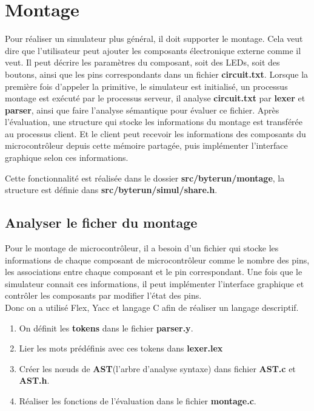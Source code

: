 \documentclass[14px]{article}
\begin{document}
	\clearpage
	\pagestyle{fancy}
	\rhead{\thepage}
	\fancyfoot{}

	\section{Montage}
	Pour réaliser un simulateur plus général, il doit supporter le montage. Cela veut dire que l'utilisateur peut ajouter les composants électronique externe comme il veut. Il peut décrire les paramètres du composant, soit des LEDs, soit des boutons, ainsi que les pins correspondants dans un fichier \textbf{circuit.txt}. Lorsque la première fois d'appeler la primitive, le simulateur est initialisé, un processus montage est exécuté par le processus serveur, il analyse \textbf{circuit.txt} par \textbf{lexer} et \textbf{parser}, ainsi que faire l'analyse sémantique pour évaluer ce fichier. Après l'évaluation, une structure qui stocke les informations du montage est transférée au processus client. Et le client peut recevoir les informations des composants du microcontrôleur depuis cette mémoire partagée, puis implémenter l'interface graphique selon ces informations.

	Cette fonctionnalité est réalisée dans le dossier \textbf{src/byterun/montage}, la structure est définie dans \textbf{src/byterun/simul/share.h}.

	\subsection{Analyser le ficher du montage}
	Pour le montage de microcontrôleur, il a besoin d'un fichier qui stocke les informations de chaque composant de microcontrôleur comme le nombre des pins, les associations entre chaque composant et le pin correspondant. Une fois que le simulateur connait ces informations, il peut implémenter l'interface graphique et contrôler les composants par modifier l'état des pins.\\
	Donc on a utilisé Flex, Yacc et langage C afin de réaliser un langage descriptif.
	\begin{enumerate}
		\item On définit les \textbf{tokens} dans le fichier \textbf{parser.y}.
		\item Lier les mots prédéfinis avec ces tokens dans \textbf{lexer.lex}
		\item Créer les nœuds de \textbf{AST}(l'arbre d'analyse syntaxe) dans fichier \textbf{AST.c} et \textbf{AST.h}.
		\item Réaliser les fonctions de l'évaluation dans le fichier \textbf{montage.c}.
	\end{enumerate}
\end{document}
